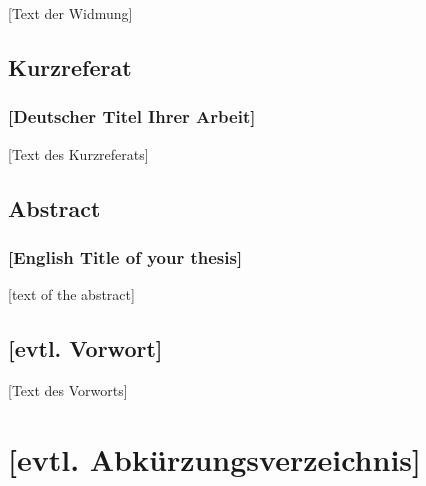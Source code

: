 \documentclass[a4paper,12pt,twoside]{scrreprt}
\begin{document}
[Text der Widmung]

\newpage
\section*{Kurzreferat}

\subsection*{[Deutscher Titel Ihrer Arbeit]}

[Text des Kurzreferats]


\newpage
\section*{Abstract}
\subsection*{[English Title of your thesis]}

[text of the abstract]


\newpage
\section*{[evtl. Vorwort]}   %

[Text des Vorworts]


\cleardoublepage\tableofcontents

\clearpage
{}
\listoffigures

\clearpage
{}
\listoftables

\clearpage
{}  %
\chapter*{[evtl. Abkürzungsverzeichnis]} %
\begin{acronym}[SQL]
\end{acronym}
\end{document}
